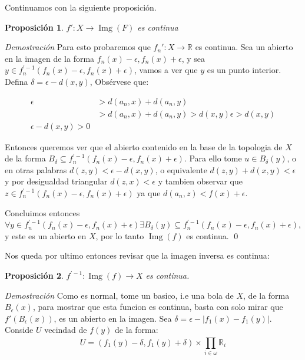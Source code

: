 \documentclass[]{article}
\newtheorem{prop}{Proposición}
\newcommand{\abs}[1]{\left| #1 \right|}
\newcommand{\RR}{\mathbb{R}}
\newcommand{\function}[3]{#1 : #2 \rightarrow #3}
\newcommand{\contained}{\subseteq}
\begin{document}
 Continuamos con la siguiente proposición.
 
 \begin{prop}
 	$ \function{f'}{X}{\operatorname{Img}(F)}$ es continua 
 \end{prop}
 
 \textit{Demostración} Para esto  probaremos que $ f_n': X \rightarrow \RR $ es continua. Sea un abierto en la imagen de la forma $ f_n(x) - \epsilon, f_n(x) + \epsilon $, y sea $ y \in f^{'-1}_n(f_n(x) - \epsilon, f_n(x) + \epsilon) $, vamos a ver que $y$ es un punto interior. Defina $ \delta = \epsilon - d(x,y) $, Obsérvese que:
 
 \begin{align*}
 \epsilon &> d(a_n,x) + d(a_n,y) \\
  &> d(a_n,x) + d(a_n,y) > d(x,y)
  \epsilon > d(x,y) \\
  \epsilon - d(x,y) > 0
 \end{align*}
 
 Entonces queremos ver que el abierto contenido en la base de la topologia de $X$ de la forma $ B_{\delta} \contained f^{'-1}_n(f_n(x) - \epsilon, f_n(x) + \epsilon). $ Para ello tome $u \in B_{\delta}(y)$, o en otras palabras $ d(z,y) < \epsilon - d(x,y) $, o equivalente $ d(z,y) + d(x,y) < \epsilon $ y por desigualdad triangular $ d(z,x) < \epsilon $ y tambien observar que $ z \in f^{'-1}_n(f_n(x) - \epsilon, f_n(x) + \epsilon) $ ya que $ d(a_n,z) < f(x) +\epsilon $.
 
 Concluimos entonces $ \forall y \in f^{'-1}_n(f_n(x) - \epsilon, f_n(x) + \epsilon) \exists B_{\delta}(y) \contained f^{'-1}_n(f_n(x) - \epsilon, f_n(x) + \epsilon)$, y este es un abierto en $X$, por lo tanto $ \operatorname{Img}(f) $ es continua. \qed
 
 Nos queda por ultimo entonces revisar que la imagen inversa es continua:
 
 \begin{prop}
 	$ \function{f^{'-1}}{\operatorname{Img}(f)}{X} $ es continua.
 \end{prop}
 
 \textit{Demostración}
 Como es normal, tome un basico, i.e una bola de $X$, de la forma $ B_\epsilon(x) $, para mostrar que esta funcion es continua, basta con solo mirar que $ f'(B_\epsilon(x)) $, es un abierto en la imagen. Sea $ \delta = \epsilon - \abs{f_1(x) - f_1(y)} $. Conside $U$ vecindad de $ f(y) $ de la forma:
 \[ U = (f_1(y) - \delta, f_1(y) + \delta) \times \prod_{i \in \omega}^{} \RR_i \]
 
\end{document}
